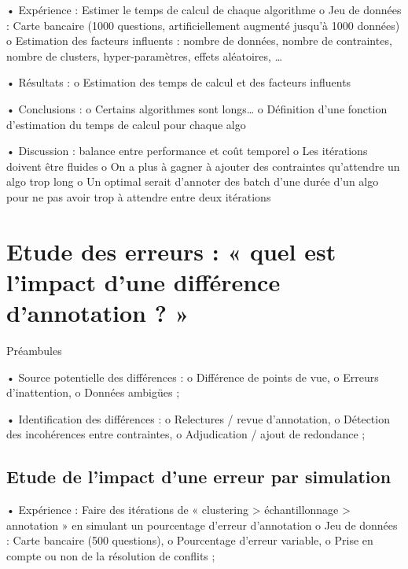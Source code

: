         •	Expérience : Estimer le temps de calcul de chaque algorithme
            o	Jeu de données : Carte bancaire (1000 questions, artificiellement augmenté jusqu’à 1000 données)
            o	Estimation des facteurs influents : nombre de données, nombre de contraintes, nombre de clusters, hyper-paramètres, effets aléatoires, …

        •	Résultats :
            o	Estimation des temps de calcul et des facteurs influents

        •	Conclusions :
            o	Certains algorithmes sont longs…
            o	Définition d’une fonction d’estimation du temps de calcul pour chaque algo

        •	Discussion : balance entre performance et coût temporel
            o	Les itérations doivent être fluides
            o	On a plus à gagner à ajouter des contraintes qu’attendre un algo trop long
            o	Un optimal serait d’annoter des batch d’une durée d’un algo pour ne pas avoir trop à attendre entre deux itérations

    \section{Etude des erreurs : « quel est l’impact d’une différence d’annotation ? »}

        Préambules

        •	Source potentielle des différences :
            o	Différence de points de vue,
            o	Erreurs d’inattention,
            o	Données ambigües ;

        •	Identification des différences :
            o	Relectures / revue d’annotation,
            o	Détection des incohérences entre contraintes,
            o	Adjudication / ajout de redondance ;


        \subsection{Etude de l’impact d’une erreur par simulation}

        •	Expérience : Faire des itérations de « clustering > échantillonnage > annotation » en simulant un pourcentage d’erreur d’annotation
            o	Jeu de données : Carte bancaire (500 questions),
            o	Pourcentage d’erreur variable,
            o	Prise en compte ou non de la résolution de conflits ;

